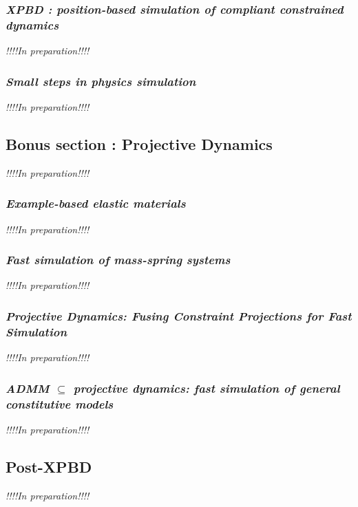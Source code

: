 \documentclass[pdflatex,sn-mathphys-num]{sn-jnl}%
\theoremstyle{thmstyleone}%
\theoremstyle{thmstyletwo}%
\theoremstyle{thmstylethree}%
\newcommand{\inprep}{
	\begin{center}
		\sl\rm {!!!!In preparation!!!!}
\end{center}}
\begin{document}
\subsubsection{\small{\sl XPBD : position-based simulation of compliant constrained dynamics}\cite{XPBD}}
\inprep

\subsubsection{{\sl Small steps in physics simulation}\cite{SmallSteps}}
\inprep
\subsection{Bonus section : Projective Dynamics}
\inprep
\subsubsection{{\sl Example-based elastic materials}\cite{Example-basedMartin}}
\inprep
\subsubsection{{\sl Fast simulation of mass-spring systems}\cite{fastMassTiantian}}
\inprep
\subsubsection{\small{\sl Projective Dynamics: Fusing Constraint Projections for Fast Simulation}\cite{ProjDyn}}
\inprep
\subsubsection{\small{\sl ADMM $\subseteq$ projective dynamics: fast simulation of general constitutive models}\cite{ADMM_Proj}}
\inprep

\subsection{Post-XPBD}
\inprep
\newpage
\appendix
\end{document}
